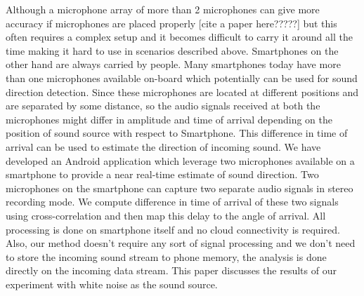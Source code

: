 Although a microphone array of more than 2 microphones can give more accuracy if microphones are placed properly [cite a paper here?????] but this often requires a complex setup and it becomes difficult to carry it around all the time making it hard to use in scenarios described above. 
Smartphones on the other hand are always carried by people. Many smartphones today have more than one microphones available on-board which potentially can be used for sound direction detection. Since these microphones are located at different positions and are separated by some distance, so the audio signals received at both the microphones might differ in amplitude and time of arrival depending on the position of sound source with respect to Smartphone. This difference in time of arrival can be used to estimate the direction of incoming sound. We have developed an Android application which leverage two microphones available on a smartphone to provide a near real-time estimate of sound direction. Two microphones on the smartphone can capture two separate audio signals in stereo recording mode. We compute difference in time of arrival of these two signals using cross-correlation and then map this delay to the angle of arrival. All processing is done on smartphone itself and no cloud connectivity is required. Also, our method doesn't require any sort of signal processing and we don't need to store the incoming sound stream to phone memory, the analysis is done directly on the incoming data stream. This paper discusses the results of our experiment with white noise as the sound source.

